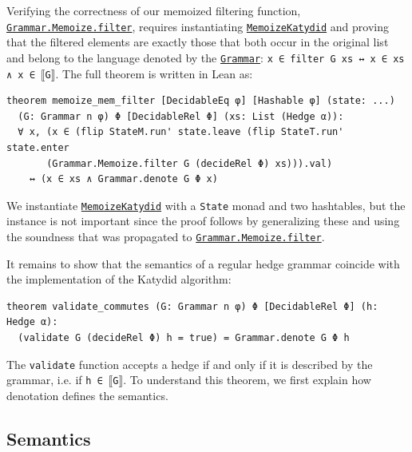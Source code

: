 \documentclass[acmsmall,%
  screen,%
  authorversion, %
  nonacm%
]{acmart}
\newcommand{\link}[2]{\mbox{\hyperref[#2]{\lstinline{#1}}}\xspace}
\newcommand{\Grammar}{\link{Grammar}{Grammar}}
\newcommand{\GrammarMemoizeFilter}{\link{Grammar.Memoize.filter}{def Grammar.Memoize.filter}}
\newcommand{\MemoizeKatydid}{\link{MemoizeKatydid}{MemoizeKatydid}}
\begin{document}
Verifying the correctness of our memoized filtering function, \GrammarMemoizeFilter, requires instantiating \MemoizeKatydid and proving that the filtered elements are exactly those that both occur in the original list and belong to the language denoted by the \Grammar: \lstinline{x ∈ filter G xs ↔ x ∈ xs ∧ x ∈}~$\llbracket$\lstinline{G}$\rrbracket$.
The full theorem is written in Lean as:
\begin{lstlisting}[label=theorem memoize_mem_filter]
theorem memoize_mem_filter [DecidableEq φ] [Hashable φ] (state: ...)
  (G: Grammar n φ) Φ [DecidableRel Φ] (xs: List (Hedge α)):
  ∀ x, (x ∈ (flip StateM.run' state.leave (flip StateT.run' state.enter
       (Grammar.Memoize.filter G (decideRel Φ) xs))).val)
    ↔ (x ∈ xs ∧ Grammar.denote G Φ x)
\end{lstlisting}
We instantiate \MemoizeKatydid with a \lstinline{State} monad and two hashtables, but the instance is not important since the proof follows by generalizing these and using the soundness that was propagated to \GrammarMemoizeFilter.

It remains to show that the semantics of a regular hedge grammar coincide with the implementation of the Katydid algorithm:
\begin{lstlisting}[label=theorem validate_commutes]
theorem validate_commutes (G: Grammar n φ) Φ [DecidableRel Φ] (h: Hedge α):
  (validate G (decideRel Φ) h = true) = Grammar.denote G Φ h
\end{lstlisting}
The \lstinline{validate} function accepts a hedge if and only if it is described by the grammar, i.e. if \lstinline{h}~\lstinline{∈}~$\llbracket$\lstinline{G}$\rrbracket$.
To understand this theorem, we first explain how denotation defines the semantics.

\subsection{Semantics}
\end{document}
